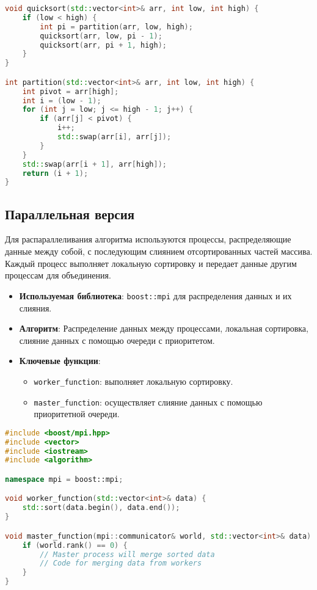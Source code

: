 \documentclass[a4paper,12pt]{article}
\begin{document}
\begin{lstlisting}[language=C++]
void quicksort(std::vector<int>& arr, int low, int high) {
    if (low < high) {
        int pi = partition(arr, low, high);
        quicksort(arr, low, pi - 1);
        quicksort(arr, pi + 1, high);
    }
}

int partition(std::vector<int>& arr, int low, int high) {
    int pivot = arr[high];
    int i = (low - 1);
    for (int j = low; j <= high - 1; j++) {
        if (arr[j] < pivot) {
            i++;
            std::swap(arr[i], arr[j]);
        }
    }
    std::swap(arr[i + 1], arr[high]);
    return (i + 1);
}
\end{lstlisting}

\subsection*{Параллельная версия}
Для распараллеливания алгоритма используются процессы, распределяющие данные между собой, с последующим слиянием отсортированных частей массива. Каждый процесс выполняет локальную сортировку и передает данные другим процессам для объединения.

\begin{itemize}
\item \textbf{Используемая библиотека}: \texttt{boost::mpi} для распределения данных и их слияния.
\item \textbf{Алгоритм}: Распределение данных между процессами, локальная сортировка, слияние данных с помощью очереди с приоритетом.
\item \textbf{Ключевые функции}:
    \begin{itemize}
    \item \texttt{worker\_function}: выполняет локальную сортировку.
    \item \texttt{master\_function}: осуществляет слияние данных с помощью приоритетной очереди.
    \end{itemize}
\end{itemize}

\begin{lstlisting}[language=C++]
#include <boost/mpi.hpp>
#include <vector>
#include <iostream>
#include <algorithm>

namespace mpi = boost::mpi;

void worker_function(std::vector<int>& data) {
    std::sort(data.begin(), data.end());
}

void master_function(mpi::communicator& world, std::vector<int>& data) {
    if (world.rank() == 0) {
        // Master process will merge sorted data
        // Code for merging data from workers
    }
}
\end{lstlisting}
\end{document}
